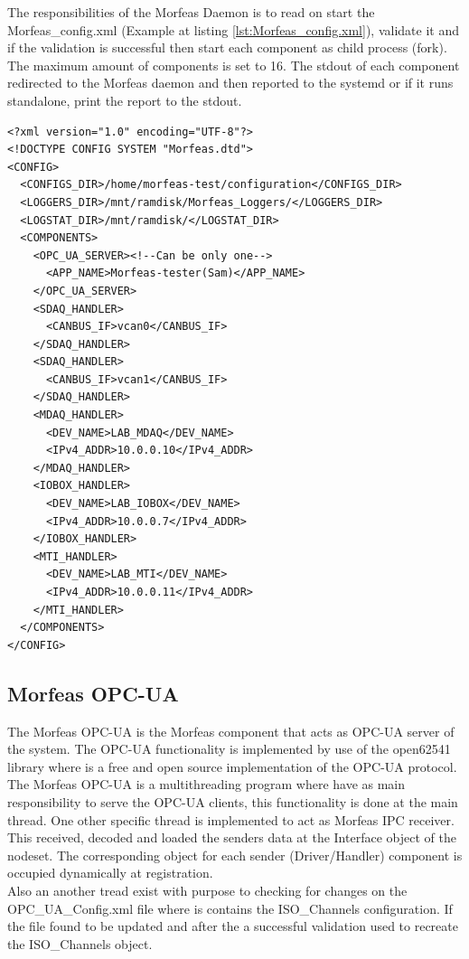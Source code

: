 \documentclass{article}
\begin{document}
The responsibilities of the Morfeas Daemon is to read on start the Morfeas\_config.xml (Example at listing \ref{lst:Morfeas_config.xml}),
validate it and if the validation is successful then start each component as child process (fork). The maximum amount of components is set to 16.
The stdout of each component redirected to the Morfeas daemon and then reported to the systemd or if it runs standalone, print the report to the stdout.

\begin{lstlisting}[frame=single,caption=Example of Morfeas\_config.xml,label=lst:Morfeas_config.xml]
<?xml version="1.0" encoding="UTF-8"?>
<!DOCTYPE CONFIG SYSTEM "Morfeas.dtd">
<CONFIG>
  <CONFIGS_DIR>/home/morfeas-test/configuration</CONFIGS_DIR>
  <LOGGERS_DIR>/mnt/ramdisk/Morfeas_Loggers/</LOGGERS_DIR>
  <LOGSTAT_DIR>/mnt/ramdisk/</LOGSTAT_DIR>
  <COMPONENTS>
    <OPC_UA_SERVER><!--Can be only one-->
      <APP_NAME>Morfeas-tester(Sam)</APP_NAME>
    </OPC_UA_SERVER>
    <SDAQ_HANDLER>
      <CANBUS_IF>vcan0</CANBUS_IF>
    </SDAQ_HANDLER>
    <SDAQ_HANDLER>
      <CANBUS_IF>vcan1</CANBUS_IF>
    </SDAQ_HANDLER>
    <MDAQ_HANDLER>
      <DEV_NAME>LAB_MDAQ</DEV_NAME>
      <IPv4_ADDR>10.0.0.10</IPv4_ADDR>
    </MDAQ_HANDLER>
    <IOBOX_HANDLER>
      <DEV_NAME>LAB_IOBOX</DEV_NAME>
      <IPv4_ADDR>10.0.0.7</IPv4_ADDR>
    </IOBOX_HANDLER>
    <MTI_HANDLER>
      <DEV_NAME>LAB_MTI</DEV_NAME>
      <IPv4_ADDR>10.0.0.11</IPv4_ADDR>
    </MTI_HANDLER>
  </COMPONENTS>
</CONFIG>
\end{lstlisting}

\newpage
\subsection{Morfeas OPC-UA}
The Morfeas OPC-UA is the Morfeas component that acts as OPC-UA server of the system. The OPC-UA functionality is implemented by use of the open62541 library where is a free and open source
implementation of the OPC-UA protocol. The Morfeas OPC-UA is a multithreading program where have as main responsibility to serve the OPC-UA clients, this functionality is done at the main
thread. One other specific thread is implemented to act as Morfeas IPC receiver. This received, decoded and loaded the senders data at the Interface object of the nodeset.
The corresponding object
for each sender (Driver/Handler) component is occupied dynamically at registration.\\
Also an another tread exist with purpose to checking for changes on the OPC\_UA\_Config.xml file where is contains the ISO\_Channels configuration.
If the file found to be updated and after the a successful validation used to recreate the ISO\_Channels object.\\
\end{document}
